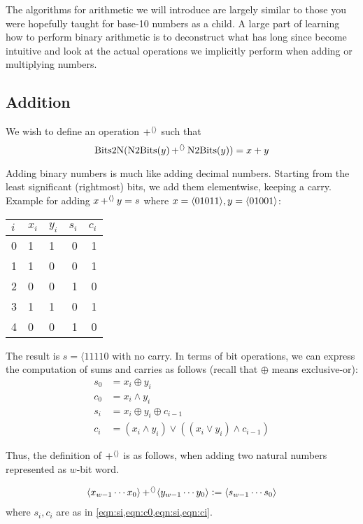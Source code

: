 The algorithms for arithmetic we will introduce are largely similar to
those you were hopefully taught for base-10 numbers as a child.  A
large part of learning how to perform binary arithmetic is to
deconstruct what has long since become intuitive and look at the
actual operations we implicitly perform when adding or multiplying
numbers.

\subsection{Addition}
\label{sec:bit-addition}

We wish to define an operation $\operatorname{+^{\langle\rangle}}$ such that
\begin{equation}
  \mathrm{Bits2N}(\mathrm{N2Bits}(y)\operatorname{+^{\langle\rangle}}{}\mathrm{N2Bits}(y)) = x + y
\end{equation}

Adding binary numbers is much like adding decimal numbers.  Starting
from the least significant (rightmost) bits, we add them elementwise,
keeping a carry.  Example for adding $x\operatorname{+^{\langle\rangle}}{} y=s$ where
$x=\langle 01011 \rangle, y=\langle 01001 \rangle$:

\begin{center}
\begin{tabular}{l|llrr}
  $i$ & $x_{i}$ & $y_{i}$ & $s_{i}$ & $c_{i}$ \\\hline
  0 & 1 & 1 & 0 & 1 \\
  1 & 1 & 0 & 0 & 1 \\
  2 & 0 & 0 & 1 & 0 \\
  3 & 1 & 1 & 0 & 1 \\
  4 & 0 & 0 & 1 & 0
\end{tabular}
\end{center}

The result is $s=\langle{11110}$ with no carry.  In terms of bit
operations, we can express the computation of sums and carries as
follows (recall that $\oplus$ means exclusive-or):
\begin{align}
  s_{0} &= x_{i} \oplus y_{i} \label{eqn:s0} \\
  c_{0} &= x_{i} \land y_{i} \label{eqn:c0} \\
  s_{i} &= x_{i} \oplus y_{i} \oplus c_{i-1} \label{eqn:si} \\
  c_{i} &= (x_{i} \land y_{i})\lor ((x_{i}\lor y_{i})\land c_{i-1}) \label{eqn:ci}
\end{align}

Thus, the definition of $\operatorname{+^{\langle\rangle}}$ is as follows, when adding two
natural numbers represented as $w$-bit word.
\begin{definition}
\begin{align*}
  \langle x_{w-1}\cdots{}x_{0} \rangle \operatorname{+^{\langle\rangle}} \langle y_{w-1}\cdots{}y_{0} \rangle \vcentcolon=
  \langle s_{w-1}\cdots{}s_{0} \rangle
\end{align*}
where $s_{i},c_{i}$ are as in \cref{eqn:si,eqn:c0,eqn:si,eqn:ci}.
\label{def:intadd}
\end{definition}

